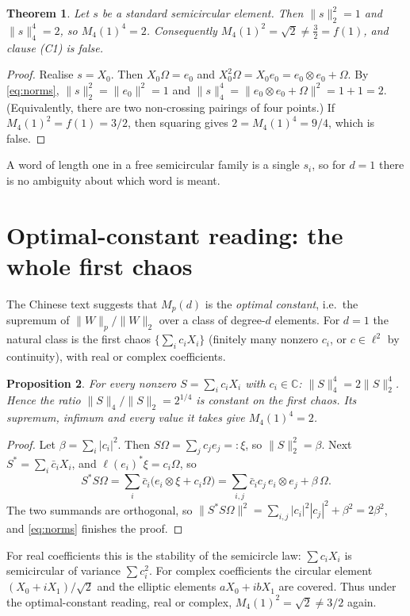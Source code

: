 \documentclass[11pt]{article}
\newtheorem{theorem}{Theorem}
\newtheorem{proposition}[theorem]{Proposition}
\theoremstyle{definition}
\theoremstyle{remark}
\begin{document}
\begin{theorem}\label{thm:main}
Let $s$ be a standard semicircular element. Then $\|s\|_2^2=1$ and $\|s\|_4^4=2$, so
$M_4(1)^4=2$. Consequently $M_4(1)^2=\sqrt2\ne\tfrac32=f(1)$, and clause (C1) is false.
\end{theorem}

\begin{proof}
Realise $s=X_0$. Then $X_0\Omega=e_0$ and
$X_0^2\Omega=X_0e_0=e_0\otimes e_0+\Omega$. By \eqref{eq:norms},
$\|s\|_2^2=\|e_0\|^2=1$ and $\|s\|_4^4=\|e_0\otimes e_0+\Omega\|^2=1+1=2$.
(Equivalently, there are two non-crossing pairings of four points.) If $M_4(1)^2=f(1)=3/2$, then
squaring gives $2=M_4(1)^4=9/4$, which is false.
\end{proof}

A word of length one in a free semicircular family is a single $s_i$, so for $d=1$ there is no
ambiguity about which word is meant.

\section{Optimal-constant reading: the whole first chaos}

The Chinese text suggests that $M_p(d)$ is the \emph{optimal constant}, i.e.\ the supremum of
$\|W\|_p/\|W\|_2$ over a class of degree-$d$ elements. For $d=1$ the natural class is the first
chaos $\{\sum_i c_iX_i\}$ (finitely many nonzero $c_i$, or $c\in\ell^2$ by continuity), with real or
complex coefficients.

\begin{proposition}\label{prop:chaos1}
For every nonzero $S=\sum_i c_iX_i$ with $c_i\in\mathbb C$: $\|S\|_4^4=2\|S\|_2^4$. Hence the ratio
$\|S\|_4/\|S\|_2=2^{1/4}$ is constant on the first chaos. Its supremum, infimum and every value it
takes give $M_4(1)^4=2$.
\end{proposition}

\begin{proof}
Let $\beta=\sum_i|c_i|^2$. Then $S\Omega=\sum_jc_je_j=:\xi$, so $\|S\|_2^2=\beta$. Next
$S^*=\sum_i\bar c_iX_i$, and $\ell(e_i)^*\xi=c_i\Omega$, so
\[
S^*S\Omega=\sum_i\bar c_i\big(e_i\otimes\xi+c_i\Omega\big)
=\sum_{i,j}\bar c_ic_j\,e_i\otimes e_j+\beta\,\Omega .
\]
The two summands are orthogonal, so
$\|S^*S\Omega\|^2=\sum_{i,j}|c_i|^2|c_j|^2+\beta^2=2\beta^2$, and \eqref{eq:norms} finishes the
proof.
\end{proof}

For real coefficients this is the stability of the semicircle law: $\sum c_iX_i$ is semicircular
of variance $\sum c_i^2$. For complex coefficients the circular element
$(X_0+iX_1)/\sqrt2$ and the elliptic elements $aX_0+ibX_1$ are covered. Thus under the
optimal-constant reading, real or complex, $M_4(1)^2=\sqrt2\ne3/2$ again.
\end{document}
